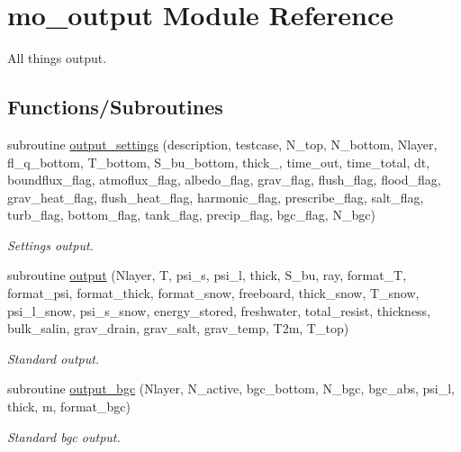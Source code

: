 \hypertarget{namespacemo__output}{
\section{mo\_\-output Module Reference}
\label{namespacemo__output}
}


All things output.  


\subsection*{Functions/Subroutines}
\begin{DoxyCompactItemize}
\item 
subroutine \hyperlink{namespacemo__output_a9d48b3b49e6dbe858e06c8fe1dc4bfbd}{output\_\-settings} (description, testcase, N\_\-top, N\_\-bottom, Nlayer, fl\_\-q\_\-bottom, T\_\-bottom, S\_\-bu\_\-bottom, thick\_, time\_\-out, time\_\-total, dt, boundflux\_\-flag, atmoflux\_\-flag, albedo\_\-flag, grav\_\-flag, flush\_\-flag, flood\_\-flag, grav\_\-heat\_\-flag, flush\_\-heat\_\-flag, harmonic\_\-flag, prescribe\_\-flag, salt\_\-flag, turb\_\-flag, bottom\_\-flag, tank\_\-flag, precip\_\-flag, bgc\_\-flag, N\_\-bgc)
\begin{DoxyCompactList}\small\item\em Settings output. \item\end{DoxyCompactList}\item 
subroutine \hyperlink{namespacemo__output_a2f2d04e394ea77f4d4c0a61207edd0a6}{output} (Nlayer, T, psi\_\-s, psi\_\-l, thick, S\_\-bu, ray, format\_\-T, format\_\-psi, format\_\-thick, format\_\-snow, freeboard, thick\_\-snow, T\_\-snow, psi\_\-l\_\-snow, psi\_\-s\_\-snow, energy\_\-stored, freshwater, total\_\-resist, thickness, bulk\_\-salin, grav\_\-drain, grav\_\-salt, grav\_\-temp, T2m, T\_\-top)
\begin{DoxyCompactList}\small\item\em Standard output. \item\end{DoxyCompactList}\item 
subroutine \hyperlink{namespacemo__output_a0c4b84f221bda333c52a4aaa7e2a854d}{output\_\-bgc} (Nlayer, N\_\-active, bgc\_\-bottom, N\_\-bgc, bgc\_\-abs, psi\_\-l, thick, m, format\_\-bgc)
\begin{DoxyCompactList}\small\item\em Standard bgc output. \item\end{DoxyCompactList}\item 

\end{DoxyCompactItemize}
